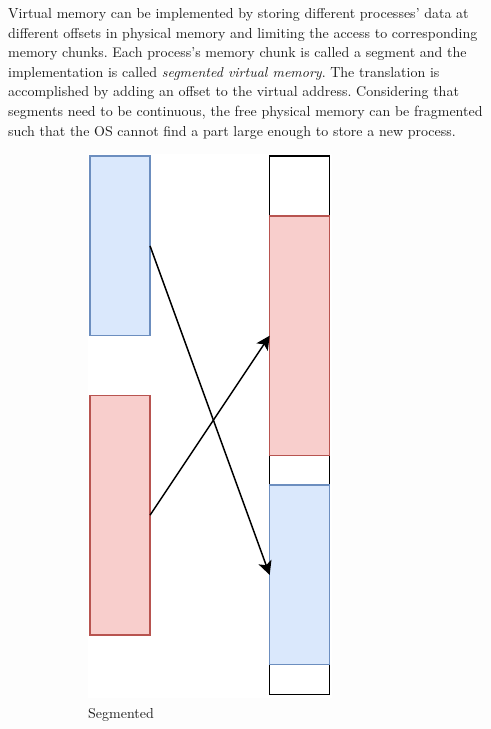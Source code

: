 Virtual memory can be implemented by storing different processes' data at 
different offsets in physical memory and limiting the access to corresponding 
memory chunks. Each process's memory chunk is called a segment and the 
implementation is called \emph{segmented virtual memory}. The translation is 
accomplished by adding an offset to the virtual address. Considering that 
segments need to be continuous, the free physical memory can be fragmented
such that the OS cannot find a part large enough to store a new process.

\begin{figure}

  \begin{subfigure}[]{.45\linewidth}
    \centering
    \includegraphics[width=.5\linewidth]{img/segmented.pdf}
    \caption{Segmented}
  \end{subfigure}
  \hfill
  \begin{subfigure}[]{.45\linewidth}
    \centering

\end{subfigure}
\end{figure}
